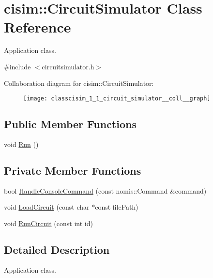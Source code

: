 \hypertarget{classcisim_1_1_circuit_simulator}{}\section{cisim\+:\+:Circuit\+Simulator Class Reference}
\label{classcisim_1_1_circuit_simulator}


Application class.  




{\ttfamily \#include $<$circuitsimulator.\+h$>$}



Collaboration diagram for cisim\+:\+:Circuit\+Simulator\+:
\nopagebreak
\begin{figure}[H]
\begin{center}
\leavevmode
\texttt{[image: classcisim\_1\_1\_circuit\_simulator\_\_coll\_\_graph]}
\end{center}
\end{figure}
\subsection*{Public Member Functions}
\begin{DoxyCompactItemize}
\item 
void \hyperlink{classcisim_1_1_circuit_simulator_a89c2366d2e04e54ab5e71e483349a201}{Run} ()
\end{DoxyCompactItemize}
\subsection*{Private Member Functions}
\begin{DoxyCompactItemize}
\item 
bool \hyperlink{classcisim_1_1_circuit_simulator_aa67a9890613723d761b8208b0f7a76be}{Handle\+Console\+Command} (const nomis\+::\+Command \&command)
\item 
void \hyperlink{classcisim_1_1_circuit_simulator_af4e10e4645f19572be02954eeeae8a59}{Load\+Circuit} (const char $\ast$const file\+Path)
\item 
void \hyperlink{classcisim_1_1_circuit_simulator_ab63e554831d940e08a01551d0affc1f3}{Run\+Circuit} (const int id)
\end{DoxyCompactItemize}


\subsection{Detailed Description}
Application class. 

